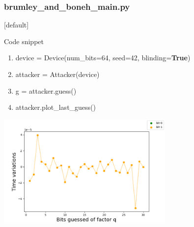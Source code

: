 \documentclass{beamer}
\begin{document}
\begin{frame}
\frametitle{brumley\_and\_boneh\_main.py}
[default]

{\scriptsize
\begin{block}{Code snippet}
  \begin{enumerate}
      \item device = Device(num\_bits=64, seed=42, blinding=\textbf{True})
      \item attacker = Attacker(device)
      \item g = attacker.guess()
      \item attacker.plot\_last\_guess()
  \end{enumerate}
\end{block}
}

\center
\includegraphics[width=0.65\textwidth]{figures/brumley_and_boneh_output_example_with_blinding}

\end{frame}
\end{document}

